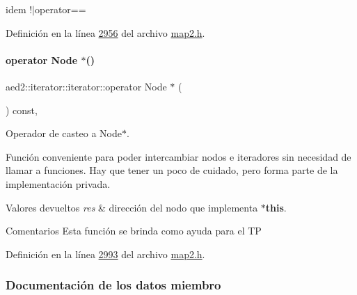 idem !$\vert$operator== 



Definición en la línea \hyperlink{map2_8h_source_l02956}{2956} del archivo \hyperlink{map2_8h_source}{map2.\+h}.

\mbox{\label{classaed2_1_1iterator_1_1iterator_af9084d95ac1d97029bb9a303abe9b862_af9084d95ac1d97029bb9a303abe9b862}} 
\paragraph{\texorpdfstring{operator Node $\ast$()}{operator Node *()}}
{\footnotesize\ttfamily aed2\+::iterator\+::iterator\+::operator Node $\ast$ (\begin{DoxyParamCaption}{ }\end{DoxyParamCaption}) const\hspace{0.3cm}{\ttfamily [inline]}, {\ttfamily [private]}}



Operador de casteo a Node$\ast$. 

Función conveniente para poder intercambiar nodos e iteradores sin necesidad de llamar a funciones. Hay que tener un poco de cuidado, pero forma parte de la implementación privada.


\begin{DoxyRetVals}{Valores devueltos}
{\em res} & dirección del nodo que implementa {\bfseries $\ast$this}.\\
\hline
\end{DoxyRetVals}
\begin{DoxyRemark}{Comentarios}
Esta función se brinda como ayuda para el TP 
\end{DoxyRemark}


Definición en la línea \hyperlink{map2_8h_source_l02993}{2993} del archivo \hyperlink{map2_8h_source}{map2.\+h}.



\subsubsection{Documentación de los datos miembro}
\mbox{\label{classaed2_1_1iterator_1_1iterator_a13e1e7981af004da89fe8feecfb384da_a13e1e7981af004da89fe8feecfb384da}} 
